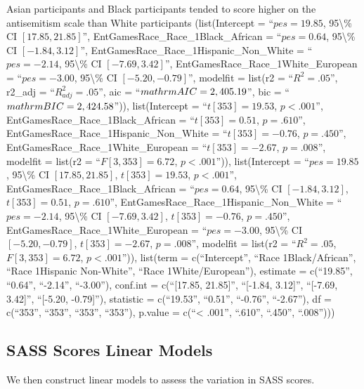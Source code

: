 \documentclass[
  doc,draftall]{apa6}
\begin{document}
Asian participants and Black participants tended to score higher on the antisemitism scale than White participants (list(Intercept = ``\(pes = 19.85\), 95\textbackslash\% CI \([17.85, 21.85]\)'', EntGamesRace\_Race\_1Black\_African = ``\(pes = 0.64\), 95\textbackslash\% CI \([-1.84, 3.12]\)'', EntGamesRace\_Race\_1Hispanic\_Non\_White = ``\(pes = -2.14\), 95\textbackslash\% CI \([-7.69, 3.42]\)'', EntGamesRace\_Race\_1White\_European = ``\(pes = -3.00\), 95\textbackslash\% CI \([-5.20, -0.79]\)'', modelfit = list(r2 = ``\(R^2 = .05\)'', r2\_adj = ``\(R^2_{adj} = .05\)'', aic = ``\(\\mathrm{AIC} = 2,405.19\)'', bic = ``\(\\mathrm{BIC} = 2,424.58\)'')), list(Intercept = ``\(t[353] = 19.53\), \(p < .001\)'', EntGamesRace\_Race\_1Black\_African = ``\(t[353] = 0.51\), \(p = .610\)'', EntGamesRace\_Race\_1Hispanic\_Non\_White = ``\(t[353] = -0.76\), \(p = .450\)'', EntGamesRace\_Race\_1White\_European = ``\(t[353] = -2.67\), \(p = .008\)'', modelfit = list(r2 = ``\(F[3, 353] = 6.72\), \(p < .001\)'')), list(Intercept = ``\(pes = 19.85\), 95\textbackslash\% CI \([17.85, 21.85]\), \(t[353] = 19.53\), \(p < .001\)'', EntGamesRace\_Race\_1Black\_African = ``\(pes = 0.64\), 95\textbackslash\% CI \([-1.84, 3.12]\), \(t[353] = 0.51\), \(p = .610\)'', EntGamesRace\_Race\_1Hispanic\_Non\_White = ``\(pes = -2.14\), 95\textbackslash\% CI \([-7.69, 3.42]\), \(t[353] = -0.76\), \(p = .450\)'', EntGamesRace\_Race\_1White\_European = ``\(pes = -3.00\), 95\textbackslash\% CI \([-5.20, -0.79]\), \(t[353] = -2.67\), \(p = .008\)'', modelfit = list(r2 = ``\(R^2 = .05\), \(F[3, 353] = 6.72\), \(p < .001\)'')), list(term = c(``Intercept'', ``Race 1Black/African'', ``Race 1Hispanic Non-White'', ``Race 1White/European''), estimate = c(``19.85'', ``0.64'', ``-2.14'', ``-3.00''), conf.int = c(``{[}17.85, 21.85{]}'', ``{[}-1.84, 3.12{]}'', ``{[}-7.69, 3.42{]}'', ``{[}-5.20, -0.79{]}''), statistic = c(``19.53'', ``0.51'', ``-0.76'', ``-2.67''), df = c(``353'', ``353'', ``353'', ``353''), p.value = c(``\textless{} .001'', ``.610'', ``.450'', ``.008'')))

\subsection{SASS Scores Linear Models}\label{sass-scores-linear-models}

We then construct linear models to assess the variation in SASS scores.
\end{document}
